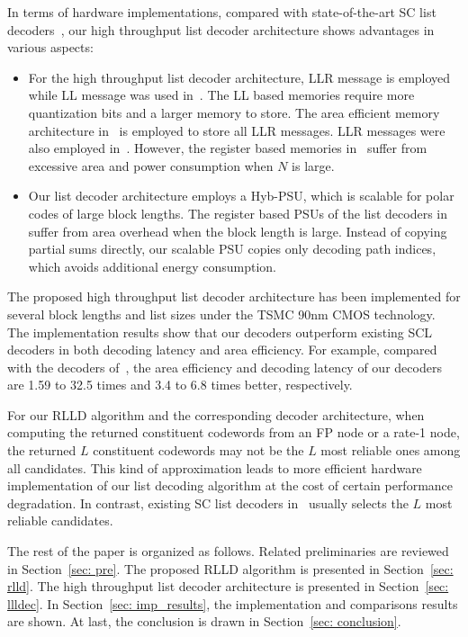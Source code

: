 \documentclass[journal]{IEEEtran}
\begin{document}
In terms of hardware implementations, compared with state-of-the-art SC list decoders~\cite{tree_list_dec, jun_low_mem_list, llr_list_tsp,llr_list, yuan_low_latency, chenrong_tsp}, our high throughput list decoder architecture shows advantages in various aspects:
\begin{itemize}
\item For the high throughput list decoder architecture, LLR message is employed while LL message was used in~\cite{tree_list_dec, jun_low_mem_list, yuan_low_latency, chenrong_tsp}. The LL based memories require more quantization bits and a larger memory to store. The area efficient memory architecture in~\cite{jun_low_mem_list} is employed to store all LLR messages. LLR messages were also employed in~\cite{llr_list_tsp,llr_list}. However, the register based memories in~\cite{llr_list_tsp, llr_list} suffer from excessive area and power consumption when $N$ is large.
\item Our list decoder architecture employs a Hyb-PSU, which is scalable for polar codes of large block lengths. The register based PSUs of the list decoders in~\cite{llr_list_tsp, jun_low_mem_list,tree_list_dec} suffer from area overhead when the block length is large. Instead of copying partial sums directly, our scalable PSU copies only decoding path indices, which avoids additional energy consumption.
\end{itemize}
The proposed high throughput list decoder architecture has been implemented for several block lengths and list sizes under the TSMC 90nm CMOS technology. The implementation results show that our decoders outperform existing SCL decoders in both decoding latency and area efficiency. For example, compared with the decoders of~\cite{llr_list_tsp}, the area efficiency and decoding latency of our decoders are 1.59 to 32.5 times and 3.4 to 6.8 times better, respectively.

For our RLLD algorithm and the corresponding decoder architecture, when computing the returned constituent codewords from an FP node or a rate-1 node, the returned $L$ constituent codewords may not be the $L$ most reliable ones among all candidates. This kind of approximation leads to more efficient hardware implementation of our list decoding algorithm at the cost of certain performance degradation. In contrast, existing SC list decoders in~\cite{ido_it,llr_list} usually selects the $L$ most reliable candidates.

The rest of the paper is organized as follows. Related preliminaries are reviewed in Section~\ref{sec: pre}. The proposed RLLD algorithm is presented in Section~\ref{sec: rlld}. The high throughput list decoder architecture is presented in Section~\ref{sec: llldec}. In Section~\ref{sec: imp_results}, the implementation and comparisons results are shown. At last, the conclusion is drawn in Section~\ref{sec: conclusion}.
\end{document}
